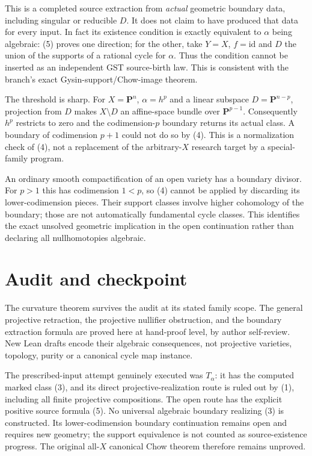 \documentclass[11pt]{article}
\begin{document}
This is a completed source extraction from \emph{actual} geometric boundary
data, including singular or reducible $D$. It does not claim to have produced
that data for every input. In fact its existence condition is exactly
equivalent to $\alpha$ being algebraic: (5) proves one direction; for
the other, take $Y=X$, $f=\mathrm{id}$ and $D$ the union of the supports
of a rational cycle for $\alpha$. Thus the condition cannot be inserted
as an independent GST source-birth law. This is consistent with the
branch's exact Gysin-support/Chow-image theorem.

The threshold is sharp. For $X=\mathbf P^n$, $\alpha=h^p$ and a linear
subspace $D=\mathbf P^{n-p}$, projection from $D$ makes
$X\setminus D$ an affine-space bundle over $\mathbf P^{p-1}$.
Consequently $h^p$ restricts to zero and the codimension-$p$ boundary
returns its actual class. A boundary of codimension $p+1$ could not do
so by (4). This is a normalization check of (4), not a replacement of
the arbitrary-$X$ research target by a special-family program.

An ordinary smooth compactification of an open variety has a boundary
divisor. For $p>1$ this has codimension $1<p$, so (4) cannot be applied
by discarding its lower-codimension pieces. Their support classes involve
higher cohomology of the boundary; those are not automatically fundamental
cycle classes. This identifies the exact unsolved geometric implication
in the open continuation rather than declaring all nullhomotopies algebraic.

\section{Audit and checkpoint}
The curvature theorem survives the audit at its stated family scope.
The general projective retraction, the projective nullifier obstruction,
and the boundary extraction formula are proved here at hand-proof level,
by author self-review. New Lean drafts encode their algebraic consequences,
not projective varieties, topology, purity or a canonical cycle map instance.

The prescribed-input attempt genuinely executed was $T_\alpha$: it has
the computed marked class (3), and its direct projective-realization route
is ruled out by (1), including all finite projective compositions. The
open route has the explicit positive source formula (5). No universal
algebraic boundary realizing (3) is constructed. Its lower-codimension
boundary continuation remains open and requires new geometry; the support
equivalence is not counted as source-existence progress. The original
all-$X$ canonical Chow theorem therefore remains unproved.
\end{document}
